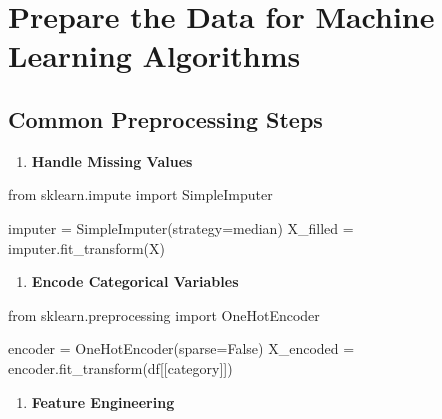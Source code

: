 \documentclass[
  letterpaper,
  DIV=11,
  numbers=noendperiod]{scrreprt}
\newenvironment{Shaded}{\begin{snugshade}}{\end{snugshade}}
\newcommand{\ImportTok}[1]{\textcolor[rgb]{0.00,0.46,0.62}{#1}}
\newcommand{\NormalTok}[1]{\textcolor[rgb]{0.00,0.23,0.31}{#1}}
\newcommand{\OperatorTok}[1]{\textcolor[rgb]{0.37,0.37,0.37}{#1}}
\newcommand{\StringTok}[1]{\textcolor[rgb]{0.13,0.47,0.30}{#1}}
\newcommand{\VariableTok}[1]{\textcolor[rgb]{0.07,0.07,0.07}{#1}}
\providecommand{\tightlist}{%
  \setlength{\itemsep}{0pt}\setlength{\parskip}{0pt}}\usepackage{longtable,booktabs,array}
\begin{document}
\section{Prepare the Data for Machine Learning
Algorithms}\label{prepare-the-data-for-machine-learning-algorithms}

\subsection{Common Preprocessing
Steps}\label{common-preprocessing-steps}

\begin{enumerate}
\def\labelenumi{\arabic{enumi}.}
\tightlist
\item
  \textbf{Handle Missing Values}
\end{enumerate}

\begin{Shaded}
\begin{Highlighting}[]
\ImportTok{from}\NormalTok{ sklearn.impute }\ImportTok{import}\NormalTok{ SimpleImputer}

\NormalTok{imputer }\OperatorTok{=}\NormalTok{ SimpleImputer(strategy}\OperatorTok{=}\StringTok{\textquotesingle{}median\textquotesingle{}}\NormalTok{)}
\NormalTok{X\_filled }\OperatorTok{=}\NormalTok{ imputer.fit\_transform(X)}
\end{Highlighting}
\end{Shaded}

\begin{enumerate}
\def\labelenumi{\arabic{enumi}.}
\setcounter{enumi}{1}
\tightlist
\item
  \textbf{Encode Categorical Variables}
\end{enumerate}

\begin{Shaded}
\begin{Highlighting}[]
\ImportTok{from}\NormalTok{ sklearn.preprocessing }\ImportTok{import}\NormalTok{ OneHotEncoder}

\NormalTok{encoder }\OperatorTok{=}\NormalTok{ OneHotEncoder(sparse}\OperatorTok{=}\VariableTok{False}\NormalTok{)}
\NormalTok{X\_encoded }\OperatorTok{=}\NormalTok{ encoder.fit\_transform(df[[}\StringTok{\textquotesingle{}category\textquotesingle{}}\NormalTok{]])}
\end{Highlighting}
\end{Shaded}

\begin{enumerate}
\def\labelenumi{\arabic{enumi}.}
\setcounter{enumi}{2}
\tightlist
\item
  \textbf{Feature Engineering}
\end{enumerate}
\end{document}

